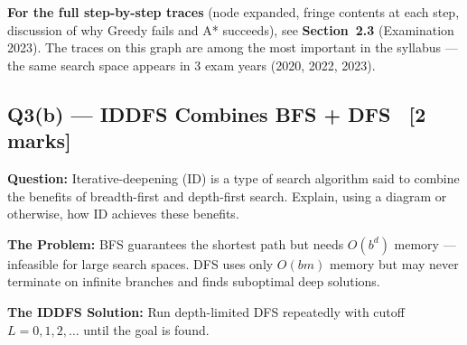 \documentclass[12pt, a4paper]{article}
\newenvironment{solutionbox}{\begin{mdframed}[style=solutionframe]}{\end{mdframed}}
\newcommand{\node}[1]{\textbf{#1}}
\begin{document}
\noindent\textbf{For the full step-by-step traces} (node expanded, fringe contents at each step, discussion of why Greedy fails and A* succeeds), see \textbf{Section~2.3} (Examination 2023). The traces on this graph are among the most important in the syllabus — the same search space appears in 3 exam years (2020, 2022, 2023).

\subsection{Q3(b) — IDDFS Combines BFS + DFS \ [2 marks]}

\begin{solutionbox}
\textbf{Question:} Iterative-deepening (ID) is a type of search algorithm said to combine the benefits of breadth-first and depth-first search. Explain, using a diagram or otherwise, how ID achieves these benefits.
\end{solutionbox}

\vspace{0.5em}

\noindent\textbf{The Problem:} BFS guarantees the shortest path but needs $O(b^d)$ memory — infeasible for large search spaces. DFS uses only $O(bm)$ memory but may never terminate on infinite branches and finds suboptimal deep solutions.

\noindent\textbf{The IDDFS Solution:} Run depth-limited DFS repeatedly with cutoff $L = 0, 1, 2, \ldots$ until the goal is found.

\begin{center}
\end{center}
\end{document}

